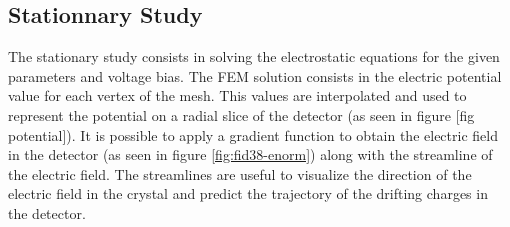 \begin{table}[]
\centering
{}%
\caption{List and Value of the default parameters for FID38}
\label{tab:fid38-default-parameters}
\end{table}

\subsection{Stationnary Study}

The stationary study consists in solving the electrostatic equations for the given parameters and voltage bias. The FEM solution consists in the electric potential value for each vertex of the mesh. This values are interpolated and used to represent the potential on a radial slice of the detector (as seen in figure [fig potential]). It is possible to apply a gradient function to obtain the electric field in the detector (as seen in figure \ref{fig:fid38-enorm}) along with the streamline of the electric field. The streamlines are useful to visualize the direction of the electric field in the crystal and predict the trajectory of the drifting charges in the detector.


